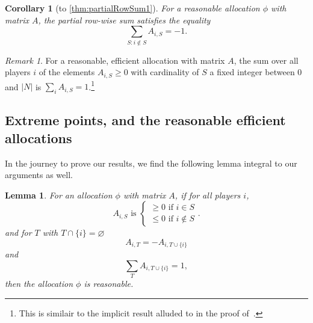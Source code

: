 \documentclass[12pt,letterpaper,final]{article}
\theoremstyle{plain}
\theoremstyle{plain}
\theoremstyle{plain}
\newtheorem{lemma}[theorem]{Lemma}
\theoremstyle{plain}
\theoremstyle{plain}
\newtheorem*{corollary}{Corollary}
\theoremstyle{plain}
\theoremstyle{plain}
\theoremstyle{definition}
\theoremstyle{definition}
\theoremstyle{definition}
\theoremstyle{definition}
\theoremstyle{definition}
\theoremstyle{remark}
\newtheorem*{remark}{Remark}
\theoremstyle{remark}
\theoremstyle{remark}
\theoremstyle{remark}
\begin{document}
\begin{corollary}[to \cref{thm:partialRowSum1}]
  For a reasonable allocation \(\phi\) with matrix \(A\), the
  partial row-wise sum satisfies the equality
  \[
    \sum_{S: i\notin S} A_{i,S} = -1.
  \]
\end{corollary}


\begin{remark}
  For a reasonable, efficient allocation with matrix \(A\), the sum over all
  players \(i\) of the elements \(A_{i,S} \geq 0\) with cardinality of
  \(S\) a fixed integer between 0 and \(|N|\) is
  \(\sum_i A_{i,S} = 1\).\footnote{This is similair to the
    implicit result alluded to in the proof of~\cite[Theorem
    13]{Weber78}.}
\end{remark}


\subsection{Extreme points, and the reasonable efficient allocations}

In the journey to prove our results, we find the following lemma
integral to our arguments as well.

\begin{lemma}\label{lem:altReasonable}
  For an allocation \(\phi\) with matrix \(A\), if for all
  players \(i\),
  \begin{equation}\label{eq:signElts}
    A_{i,S} \text{ is }
    \begin{cases}
      \geq 0 \text{ if } i\in S \\
      \leq 0 \text{ if } i\notin S
    \end{cases}.
  \end{equation}
  and for \(T\) with \(T\cap \{i\} = \varnothing\) 
  \begin{equation}\label{eq:pairningElts}
    A_{i,T} = -A_{i,T\cup\{i\}}
  \end{equation}
  and
  \begin{equation}\label{eq:partialRowSumElts}
    \sum_{T} A_{i,T\cup \{i\}}=1,
  \end{equation}
  then the allocation \(\phi\) is reasonable.
\end{lemma}
\end{document}
